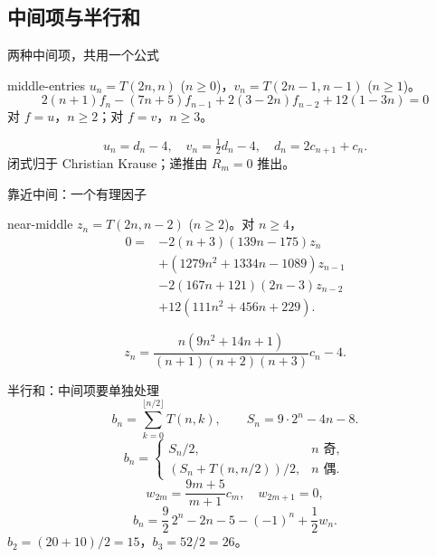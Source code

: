 \documentclass{beamer}
\begin{document}
\subsection{中间项与半行和}
\begin{frame}{两种中间项，共用一个公式}
\small
\begin{bookresult}{middle-entries}
$u_n=T(2n,n)$ ($n\ge0$)，$v_n=T(2n-1,n-1)$ ($n\ge1$)。
\[
2(n+1)f_n-(7n+5)f_{n-1}+2(3-2n)f_{n-2}+12(1-3n)=0
\]
对 $f=u$，$n\ge2$；对 $f=v$，$n\ge3$。
\end{bookresult}
\[
u_n=d_n-4,\quad v_n=\tfrac12d_n-4,\quad d_n=2c_{n+1}+c_n.
\]
闭式归于 Christian Krause；递推由 $R_m=0$ 推出。
\end{frame}
\begin{frame}{靠近中间：一个有理因子}
\small
\begin{bookresult}{near-middle}
$z_n=T(2n,n-2)$ ($n\ge2$)。对 $n\ge4$，
\[
\begin{aligned}
0={}&-2(n+3)(139n-175)z_n\\
&+(1279n^2+1334n-1089)z_{n-1}\\
&-2(167n+121)(2n-3)z_{n-2}\\
&+12(111n^2+456n+229).
\end{aligned}
\]
\end{bookresult}
\[
z_n=\frac{n(9n^2+14n+1)}{(n+1)(n+2)(n+3)}c_n-4.
\]
\end{frame}
\begin{frame}{半行和：中间项要单独处理}
\small
\[
b_n=\sum_{k=0}^{\lfloor n/2\rfloor}T(n,k),\qquad S_n=9\cdot2^n-4n-8.
\]
\[
b_n=\begin{cases}S_n/2,&n\text{ 奇},\\(S_n+T(n,n/2))/2,&n\text{ 偶}.\end{cases}
\]
\[
w_{2m}=\frac{9m+5}{m+1}c_m,\quad w_{2m+1}=0,
\]
\[
b_n=\frac92\,2^n-2n-5-(-1)^n+\frac12w_n.
\]
$ b_2=(20+10)/2=15$，$b_3=52/2=26$。
\end{frame}
\end{document}
